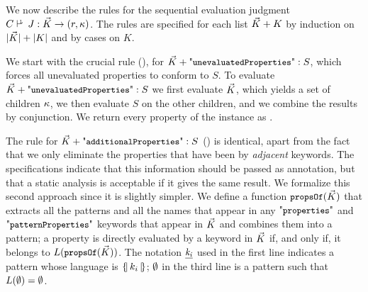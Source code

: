 



We now describe the rules for the sequential evaluation judgment $\KLJudgCJ{\Kl}\Ret{\rl}{(r,\pk)}$.
The rules are  specified for each list 
$\vec{K}+ K$
by induction on $|\vec{K}|+|K|$ and by cases on $K$.

We start with the crucial rule (\runProps),  for $\Kl\plus\aunProps: S$, which forces all unevaluated properties to conform to $S$.
To evaluate $\Kl\plus\aunProps: S$ we first evaluate $\vec{K}$, which yields  a set of {\evaluated} children
$\kappa$, we then evaluate $S$ on the other children, and we combine the results by conjunction.
We return every property of the instance as {\evaluated}.




The rule for $\Kl\plus\aaddProps: S$ (\raddProps) is identical, apart from the fact that we only eliminate the
properties that have been {\evaluated} by \emph{adjacent} keywords.
The specifications \citep{specs2020} indicate that this information should be passed as annotation, but
that a static analysis is acceptable if it gives the same result. We formalize this second approach since it is slightly simpler.
We define a function $\mbox{\tt{\small propsOf}}(\vec{K})$ that extracts all the patterns and all the names that appear
in any $\qprops$ and $\qpattProps$ keywords that appear in $\vec{K}$ and combines them into a pattern;
a property is directly evaluated by a keyword in $\vec{K}$ if, and only if, it belongs to $L(\mbox{\tt{\small propsOf}}(\vec{K}))$.
The notation $\mathit{\underline{k_i}}$ used in the first line indicates a pattern whose language is $\{\!|\,{k_i}\,|\!\}$;
$\emptyset$ in the third line is a pattern such that $L(\emptyset) = \emptyset$.


